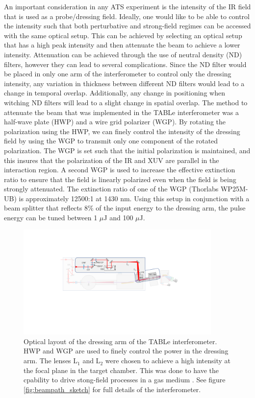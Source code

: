 An important consideration in any ATS experiment is the intensity of the IR field that is used as a probe/dressing field. Ideally, one would like to be able to control the intensity such that both perturbative and strong-field regimes can be accessed with the same optical setup.  This can be achieved by selecting an optical setup that has a high peak intensity and then attenuate the beam 
to achieve a lower intensity.  Attenuation can be achieved through the use of neutral density (ND) filters, however they can lead to several complications.  Since the ND filter would be placed in only one arm of the interferometer to control only the dressing intensity, any variation in thickness between different ND filters would lead to a change in temporal overlap.  Additionally, any change in positioning when witching ND filters will lead to a slight change in spatial overlap. The method to attenuate the beam that was implemented in the TABLe interferometer was a half-wave plate (HWP) and a wire grid polarizer (WGP).  By rotating the polarization using the HWP, we can finely control the intensity  of the dressing field by using the WGP to transmit only one component of the rotated polarization.  The WGP is set such that the initial polarization is maintained, and this insures that the polarization of the IR and XUV are parallel in the interaction region.  A second WGP is used to increase the effective extinction ratio to ensure that the field is linearly polarized even when the field is being strongly attenuated.  The extinction ratio of one of the WGP (Thorlabs WP25M-UB) is approximately 12500:1 at 1430 nm.  Using this setup in conjunction with a beam splitter that reflects 8\% of the input energy to the dressing arm, the pulse energy can be tuned between 1 $\mu$J and 100 $\mu$J.

\begin{figure}
	\centering
	\includegraphics[width=0.9\textwidth]{figures/Beamline/dressing_arm.pdf}
	\caption{Optical layout of the dressing arm of the TABLe interferometer. HWP and WGP are used to finely control the power in the dressing arm.  The lenses L$_1$ and L$_2$ were chosen to achieve a high intensity at the focal plane in the target chamber.  This was done to have the cpability to drive stong-field processes in a gas medium \cite{kiesewetterDynamicsNearThresholdAttosecond2019}.  See figure \ref{fig:beampath_sketch} for full details of the interferometer.}
	\label{fig:dressing_arm}
\end{figure}



